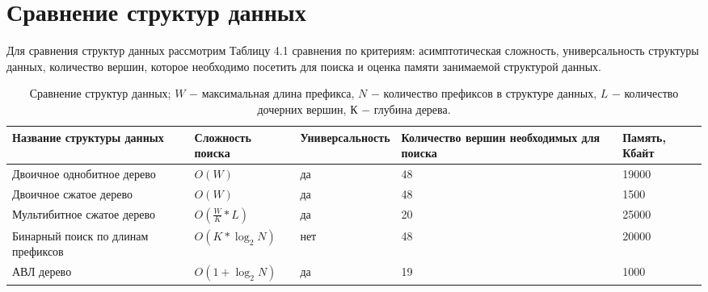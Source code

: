 \documentclass[a4peper, 12pt, titlepage, finall]{report}
\begin{document}
    \section{Сравнение структур данных}
        Для сравнения структур данных рассмотрим Таблицу 4.1 сравнения по критериям: асимптотическая сложность, универсальность структуры данных,
        количество вершин, которое необходимо посетить для поиска и оценка памяти занимаемой структурой данных. 
        
        \begin{table}[ht]
            \begin{tabular}{|m{3cm}|m{2.5cm}|m{3.5cm}|m{4cm}|m{3.2cm}|}
                \hline
                \bf Название структуры данных     & \bf Сложность поиска & \bf Универсальность & \bf Количество вершин необходимых для поиска & \bf Память, Кбайт \\
                \hline
                Двоичное однобитное дерево & $O(W)$ & да & 48 & 19000 \\
                \hline
                Двоичное сжатое дерево & $O(W)$ & да & 48 & 1500 \\
                \hline
                Мультибитное сжатое дерево & $O(\frac{W}{K}*L)$ & да & 20 & 25000 \\
                \hline
                Бинарный поиск по длинам префиксов & $O(K*\log_2{N})$ & нет & 48 & 20000 \\
                \hline
                АВЛ дерево & $O(1 + \log_2{N})$ & да & 19 & 1000 \\
                \hline
            \end{tabular}
            \caption{Сравнение структур данных; $W$ $-$ максимальная длина префикса, $N$ $-$ количество префиксов в структуре данных,
            $L$ $-$ количество дочерних вершин, $К$ $-$ глубина дерева.}
        \end{table}
        
\end{document}
